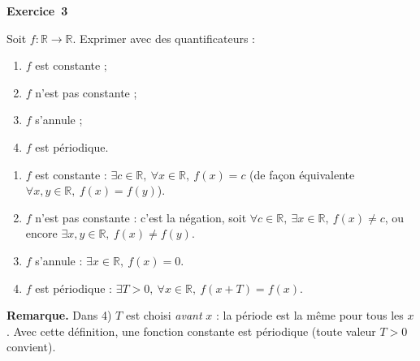 \documentclass[11pt,a4paper]{article}
\newcommand{\R}{\mathbb{R}}\newcommand{\N}{\mathbb{N}}\newcommand{\Z}{\mathbb{Z}}
\newcommand{\rem}[1]{\par\smallskip\noindent\textbf{Remarque.} #1}
\begin{document}
	\medskip\noindent\textbf{\Large\color{bleu}Exercice~3}\nopagebreak
	\begin{enonce}
		Soit $f:\mathbb{R}\to\mathbb{R}$. Exprimer avec des quantificateurs  :
		\begin{enumerate}
			\item $f$ est constante ;
			\item $f$ n’est pas constante ;
			\item $f$ s’annule ;
			\item $f$ est périodique.
		\end{enumerate}
	\end{enonce}
	\begin{corrige}
		\begin{enumerate}
			\item $f$ est constante : $\exists c\in\R,\ \forall x\in\R,\ f(x)=c$ (de façon équivalente $\forall x,y\in\R,\ f(x)=f(y)$).
			\item $f$ n'est pas constante : c'est la négation, soit $\forall c\in\R,\ \exists x\in\R,\ f(x)\neq c$, ou encore $\exists x,y\in\R,\ f(x)\neq f(y)$.
			\item $f$ s'annule : $\exists x\in\R,\ f(x)=0$.
			\item $f$ est périodique : $\exists T>0,\ \forall x\in\R,\ f(x+T)=f(x)$.
		\end{enumerate}
		\rem{Dans 4) $T$ est choisi \emph{avant} $x$ : la période est la même pour tous les $x$. Avec cette définition, une fonction constante est périodique (toute valeur $T>0$ convient).}
	\end{corrige}
	
\end{document}
